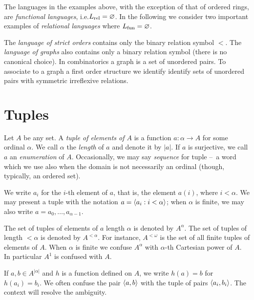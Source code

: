 The languages in the examples above, with the exception of that of ordered rings, are \emph{functional languages}, i.e.\@ $L_{\rm rel}=\varnothing$. In the following we consider two important examples of \emph{relational languages\/} where $L_{\rm fun}=\varnothing$.

\begin{example}\label{expl_graph1}
The \emph{language of strict orders\/} contains only the binary relation symbol $<$. The \emph{language of graphs\/} also contains only a binary relation symbol (there is no canonical choice). In combinatorics a graph is a set of unordered pairs. To associate to a graph a first order structure we identify identify sets of unordered pairs with symmetric irreflexive relations.\QED
\end{example}


\section{Tuples}
Let $A$ be any set. A \emph{tuple of elements of $A$\/} is a function $a:\alpha\to A$ for some ordinal $\alpha$.  We call $\alpha$ the \emph{length} of $a$ and denote it by \emph{$|a|$}. If $a$ is surjective, we call $a$ an \emph{enumeration\/} of $A$. Occasionally, we may say \emph{sequence\/} for tuple --~a word which we use  also when the domain is not necessarily an ordinal (though, typically, an ordered set).

We write \emph{$a_i$} for the $i$-th element of $a$, that is, the element $a(i)$, where $i<\alpha$. We may present a tuple with the notation \emph{$a=\langle a_i: i<\alpha\rangle$}; when $\alpha$ is finite, we may also write \emph{$a=a_0,\dots,a_{\alpha-1}$}. 

The set of tuples of elements of $a$ length $\alpha$ is denoted by \emph{$A^\alpha$}. The set of tuples of length $<\alpha$ is denoted by \emph{$A^{<\alpha}$}. For instance, \emph{$A^{<\omega}$\/} is the set of all finite tuples of elements of $A$. When $\alpha$ is finite we confuse $A^\alpha$ with $\alpha$-th Cartesian power of $A$. In particular $A^1$ is confused with $A$.

If $a,b\in A^{|\alpha|}$ and $h$ is a function defined on $A$, we write $h(a)=b$ for $h(a_i)=b_i$. We often confuse the pair $\langle a,b\rangle$ with the tuple of pairs $\langle a_i,b_i\rangle$. The context will resolve the ambiguity.


